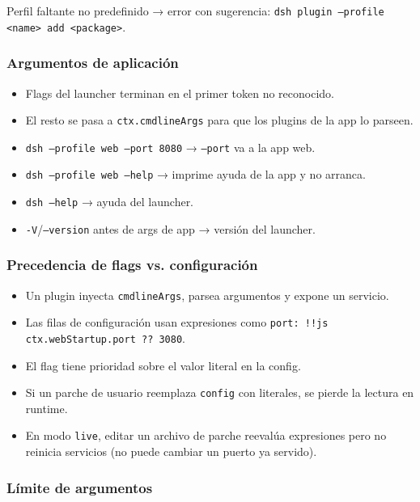 \documentclass[11pt,a4paper]{article}
\begin{document}
Perfil faltante no predefinido → error con sugerencia: \texttt{dsh plugin --profile <name> add <package>}.


\subsubsection*{Argumentos de aplicación}


\begin{itemize}[leftmargin=*,topsep=2pt,itemsep=1pt]
  \item Flags del launcher terminan en el primer token no reconocido.
  \item El resto se pasa a \texttt{ctx.cmdlineArgs} para que los plugins de la app lo parseen.
  \item \texttt{dsh --profile web --port 8080} → \texttt{--port} va a la app web.
  \item \texttt{dsh --profile web --help} → imprime ayuda de la app y no arranca.
  \item \texttt{dsh --help} → ayuda del launcher.
  \item \texttt{-V}/\texttt{--version} antes de args de app → versión del launcher.
\end{itemize}


\subsubsection*{Precedencia de flags vs. configuración}


\begin{itemize}[leftmargin=*,topsep=2pt,itemsep=1pt]
  \item Un plugin inyecta \texttt{cmdlineArgs}, parsea argumentos y expone un servicio.
  \item Las filas de configuración usan expresiones como \texttt{port: !!js ctx.webStartup.port ?? 3080}.
  \item El flag tiene prioridad sobre el valor literal en la config.
  \item Si un parche de usuario reemplaza \texttt{config} con literales, se pierde la lectura en runtime.
  \item En modo \texttt{live}, editar un archivo de parche reevalúa expresiones pero no reinicia servicios (no puede cambiar un puerto ya servido).
\end{itemize}


\subsubsection*{Límite de argumentos}
\end{document}
